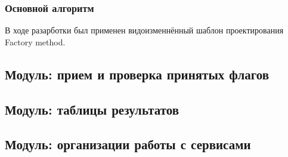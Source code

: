 \subsubsection{Основной алгоритм}
В ходе разарботки был применен видоизменнённый шаблон проектирования Factory method.


\subsection{Модуль: прием и проверка принятых флагов} %


\subsection{Модуль: таблицы результатов} %


\subsection{Модуль: организации работы с сервисами} %


\clearpage